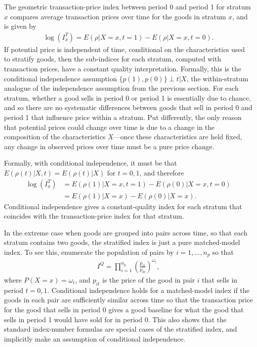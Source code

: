 \documentclass[]{article}
\begin{document}
The geometric transaction-price index between period 0 and period 1 for stratum \(x\) compares average transaction prices over time for the goods in stratum \(x\), and is given by
\begin{align*}
\log(I^{T}_{x}) = E(\rho | X = x, t = 1) - E(\rho | X = x, t = 0).
\end{align*}
If potential price is independent of time, conditional on the characteristics used to stratify goods, then the sub-indices for each stratum, computed with transaction prices, have a constant quality interpretation. Formally, this is the conditional independence assumption \(\{p(1), p(0)\} \perp t | X\), the within-stratum analogue of the independence assumption from the previous section. For each stratum, whether a good sells in period 0 or period 1 is essentially due to chance, and so there are no systematic differences between goods that sell in period 0 and period 1 that influence price within a stratum. Put differently, the only reason that potential prices could change over time is due to a change in the composition of the characteristics \(X\)---once these characteristics are held fixed, any change in observed prices over time must be a pure price change.

Formally, with conditional independence, it must be that \(E(\rho(t) | X, t) = E(\rho(t) | X)\) for \(t = 0,1\), and therefore
\begin{align*}
\log(I^{T}_{x}) &= E(\rho(1) | X = x, t = 1) - E(\rho(0) | X = x, t = 0) \\
 &= E(\rho(1) | X = x) - E(\rho(0) | X = x).
\end{align*}
Conditional independence gives a constant-quality index for each stratum that coincides with the transaction-price index for that stratum.

In the extreme case when goods are grouped into pairs across time, so that each stratum contains two goods, the stratified index is just a pure matched-model index. To see this, enumerate the population of pairs by \(i = 1,\ldots, n_{p}\) so that
\begin{align*}
I^{Q} = \prod_{i = 1}^{n_{p}} \left(\frac{p_{i1}}{p_{i0}}\right)^{\omega_{i}},
\end{align*}
where \(P(X = x) = \omega_{i}\), and \(p_{it}\) is the price of the good in pair \(i\) that sells in period \(t = 0,1\). Conditional independence holds for a matched-model index if the goods in each pair are sufficiently similar across time so that the transaction price for the good that sells in period 0 gives a good baseline for what the good that sells in period 1 would have sold for in period 0. This also shows that the standard index-number formulas are special cases of the stratified index, and implicitly make an assumption of conditional independence.
\end{document}

